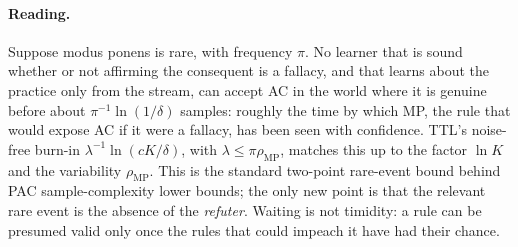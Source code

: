 \paragraph{Reading.} Suppose modus ponens is rare, with frequency $\pi$. No learner that is sound whether or not affirming the consequent is a fallacy, and that learns about the practice only from the stream, can accept AC in the world where it is genuine before about $\pi^{-1}\ln(1/\delta)$ samples: roughly the time by which MP, the rule that would expose AC if it were a fallacy, has been seen with confidence. TTL's noise-free burn-in $\lambda^{-1}\ln(cK/\delta)$, with $\lambda\le\pi\rho_{\mathrm{MP}}$, matches this up to the factor $\ln K$ and the variability $\rho_{\mathrm{MP}}$. This is the standard two-point rare-event bound behind PAC sample-complexity lower bounds; the only new point is that the relevant rare event is the absence of the \emph{refuter}. Waiting is not timidity: a rule can be presumed valid only once the rules that could impeach it have had their chance.

